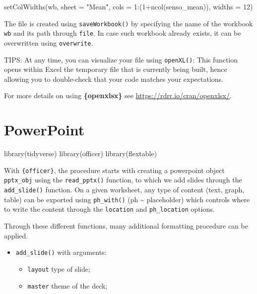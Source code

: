 \documentclass[
]{book}
\newenvironment{Shaded}{\begin{snugshade}}{\end{snugshade}}
\newcommand{\AttributeTok}[1]{\textcolor[rgb]{0.77,0.63,0.00}{#1}}
\newcommand{\DecValTok}[1]{\textcolor[rgb]{0.00,0.00,0.81}{#1}}
\newcommand{\FunctionTok}[1]{\textcolor[rgb]{0.00,0.00,0.00}{#1}}
\newcommand{\NormalTok}[1]{#1}
\newcommand{\SpecialCharTok}[1]{\textcolor[rgb]{0.00,0.00,0.00}{#1}}
\newcommand{\StringTok}[1]{\textcolor[rgb]{0.31,0.60,0.02}{#1}}
\providecommand{\tightlist}{%
  \setlength{\itemsep}{0pt}\setlength{\parskip}{0pt}}
\begin{document}
\begin{Shaded}
\begin{Highlighting}[]
\FunctionTok{setColWidths}\NormalTok{(wb, }\AttributeTok{sheet =} \StringTok{"Mean"}\NormalTok{,}
             \AttributeTok{cols =} \DecValTok{1}\SpecialCharTok{:}\NormalTok{(}\DecValTok{1}\SpecialCharTok{+}\FunctionTok{ncol}\NormalTok{(senso\_mean)), }\AttributeTok{widths =} \DecValTok{12}\NormalTok{)}
\end{Highlighting}
\end{Shaded}

The file is created using \texttt{saveWorkbook()} by specifying the name of the workbook \texttt{wb} and its path through \texttt{file}. In case such workbook already exists, it can be overwritten using \texttt{overwrite}.

TIPS: At any time, you can visualize your file using \texttt{openXL()}: This function opens within Excel the temporary file that is currently being built, hence allowing you to double-check that your code matches your expectations.

For more details on using \textbf{\{openxlsx\}} see \url{https://rdrr.io/cran/openxlsx/}.

\hypertarget{powerpoint}{%
\section{PowerPoint}\label{powerpoint}}

\begin{Shaded}
\begin{Highlighting}[]
\FunctionTok{library}\NormalTok{(tidyverse)}
\FunctionTok{library}\NormalTok{(officer)}
\FunctionTok{library}\NormalTok{(flextable)}
\end{Highlighting}
\end{Shaded}

With \texttt{\{officer\}}, the procedure starts with creating a powerpoint object \texttt{pptx\_obj} using the \texttt{read\_pptx()} function, to which we add slides through the \texttt{add\_slide()} function.
On a given worksheet, any type of content (text, graph, table) can be exported using \texttt{ph\_with()} (ph \textasciitilde{} placeholder) which controls where to write the content through the \texttt{location} and \texttt{ph\_location} options.

Through these different functions, many additional formatting procedure can be applied.

\begin{itemize}
\tightlist
\item
  \texttt{add\_slide()} with arguments:

  \begin{itemize}
  \tightlist
  \item
    \texttt{layout} type of slide;
  \item
    \texttt{master} theme of the deck;
  \end{itemize}
\end{itemize}
\end{document}
